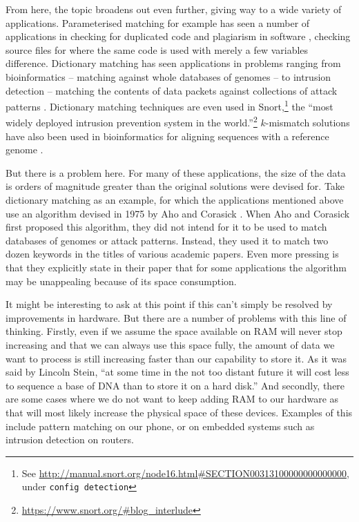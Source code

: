 \documentclass[a4paper,11pt]{article}
\begin{document}
    From here, the topic broadens out even further, giving way to a wide variety of applications. Parameterised matching for example has seen a number of applications in checking for duplicated code \cite{Baker:1993:TPP:167088.167115} and plagiarism in software \cite{Pandey:plagiarism}, checking source files for where the same code is used with merely a few variables difference. Dictionary matching has seen applications in problems ranging from bioinformatics -- matching against whole databases of genomes \cite{15713233} -- to intrusion detection -- matching the contents of data packets against collections of attack patterns \cite{1354682}. Dictionary matching techniques are even used in Snort,\footnote{See \url{http://manual.snort.org/node16.html\#SECTION00313100000000000000}, under \texttt{config detection}} the ``most widely deployed intrusion prevention system in the world.''\footnote{\url{https://www.snort.org/\#blog_interlude}} $k$-mismatch solutions have also been used in bioinformatics for aligning sequences with a reference genome \cite{Tennakoon10062012}.

    But there is a problem here. For many of these applications, the size of the data is orders of magnitude greater than the original solutions were devised for. Take dictionary matching as an example, for which the applications mentioned above use an algorithm devised in 1975 by Aho and Corasick \cite{Aho:1975:ESM:360825.360855}. When Aho and Corasick first proposed this algorithm, they did not intend for it to be used to match databases of genomes or attack patterns. Instead, they used it to match two dozen keywords in the titles of various academic papers. Even more pressing is that they explicitly state in their paper that for some applications the algorithm may be unappealing because of its space consumption.

    It might be interesting to ask at this point if this can't simply be resolved by improvements in hardware. But there are a number of problems with this line of thinking. Firstly, even if we assume the space available on RAM will never stop increasing and that we can always use this space fully, the amount of data we want to process is still increasing faster than our capability to store it. As it was said by Lincoln Stein, ``at some time in the not too distant future it will cost less to sequence a base of DNA than to store it on a hard disk.'' \cite{20441614} And secondly, there are some cases where we do not want to keep adding RAM to our hardware as that will most likely increase the physical space of these devices. Examples of this include pattern matching on our phone, or on embedded systems such as intrusion detection on routers.
\end{document}
